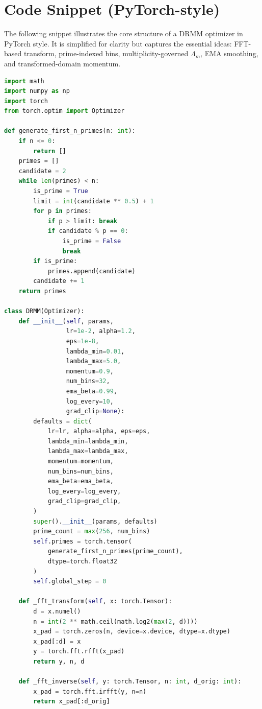 \documentclass[11pt]{article}
\begin{document}
\section{Code Snippet (PyTorch-style)}

The following snippet illustrates the core structure of a DRMM optimizer in PyTorch style. It is simplified for clarity but captures the essential ideas: FFT-based transform, prime-indexed bins, multiplicity-governed $\Lambda_m$, EMA smoothing, and transformed-domain momentum.

\begin{lstlisting}[style=code,language=Python]
import math
import numpy as np
import torch
from torch.optim import Optimizer

def generate_first_n_primes(n: int):
    if n <= 0:
        return []
    primes = []
    candidate = 2
    while len(primes) < n:
        is_prime = True
        limit = int(candidate ** 0.5) + 1
        for p in primes:
            if p > limit: break
            if candidate % p == 0:
                is_prime = False
                break
        if is_prime:
            primes.append(candidate)
        candidate += 1
    return primes

class DRMM(Optimizer):
    def __init__(self, params,
                 lr=1e-2, alpha=1.2,
                 eps=1e-8,
                 lambda_min=0.01,
                 lambda_max=5.0,
                 momentum=0.9,
                 num_bins=32,
                 ema_beta=0.99,
                 log_every=10,
                 grad_clip=None):
        defaults = dict(
            lr=lr, alpha=alpha, eps=eps,
            lambda_min=lambda_min,
            lambda_max=lambda_max,
            momentum=momentum,
            num_bins=num_bins,
            ema_beta=ema_beta,
            log_every=log_every,
            grad_clip=grad_clip,
        )
        super().__init__(params, defaults)
        prime_count = max(256, num_bins)
        self.primes = torch.tensor(
            generate_first_n_primes(prime_count),
            dtype=torch.float32
        )
        self.global_step = 0

    def _fft_transform(self, x: torch.Tensor):
        d = x.numel()
        n = int(2 ** math.ceil(math.log2(max(2, d))))
        x_pad = torch.zeros(n, device=x.device, dtype=x.dtype)
        x_pad[:d] = x
        y = torch.fft.rfft(x_pad)
        return y, n, d

    def _fft_inverse(self, y: torch.Tensor, n: int, d_orig: int):
        x_pad = torch.fft.irfft(y, n=n)
        return x_pad[:d_orig]


\end{lstlisting}
\end{document}
